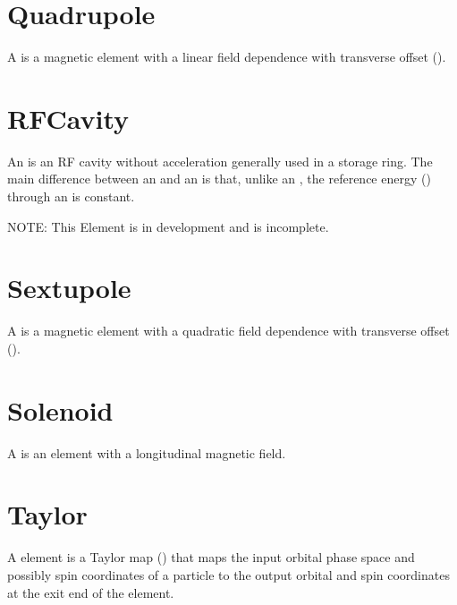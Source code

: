 \section{Quadrupole}
\label{s:quadrupole}

A  is a magnetic element with a linear field dependence
with transverse offset ().


\section{RFCavity}
\label{s:rfcavity}

An  is an RF cavity without acceleration generally used in a storage ring. The main
difference between an  and an  is that, unlike an , the
reference energy () through an  is constant.

NOTE: This Element is in development and is incomplete.

\section{Sextupole}
\label{s:sextupole}

A  is a magnetic element with a quadratic field
dependence with transverse offset ().


\section{Solenoid}
\label{s:solenoid}

A  is an element with a longitudinal magnetic field.

\section{Taylor}
\label{s:taylor}

A  element is a Taylor map () that maps the input orbital phase space and
possibly spin coordinates of a particle to the output orbital and
spin coordinates at the exit end of the element.

